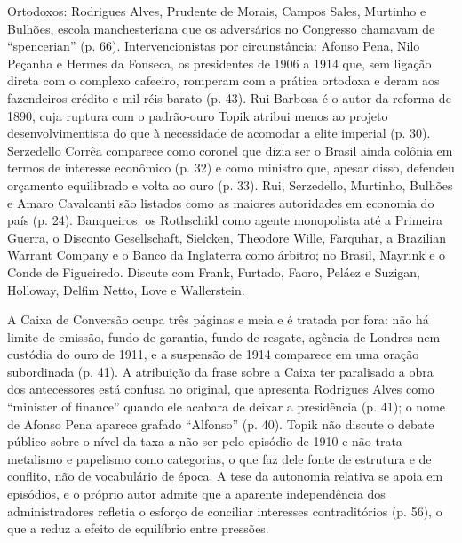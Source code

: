 Ortodoxos: Rodrigues Alves, Prudente de Morais, Campos Sales, Murtinho e Bulhões,
escola manchesteriana que os adversários no Congresso chamavam de ``spencerian''
(p. 66). Intervencionistas por circunstância: Afonso Pena, Nilo Peçanha e Hermes
da Fonseca, os presidentes de 1906 a 1914 que, sem ligação direta com o complexo
cafeeiro, romperam com a prática ortodoxa e deram aos fazendeiros crédito e
mil-réis barato (p. 43). Rui Barbosa é o autor da reforma de 1890, cuja ruptura
com o padrão-ouro Topik atribui menos ao projeto desenvolvimentista do que à
necessidade de acomodar a elite imperial (p. 30). Serzedello Corrêa comparece
como coronel que dizia ser o Brasil ainda colônia em termos de interesse
econômico (p. 32) e como ministro que, apesar disso, defendeu orçamento
equilibrado e volta ao ouro (p. 33). Rui, Serzedello, Murtinho, Bulhões e Amaro
Cavalcanti são listados como as maiores autoridades em economia do país (p. 24).
Banqueiros: os Rothschild como agente monopolista até a Primeira Guerra, o
Disconto Gesellschaft, Sielcken, Theodore Wille, Farquhar, a Brazilian Warrant
Company e o Banco da Inglaterra como árbitro; no Brasil, Mayrink e o Conde de
Figueiredo. Discute com Frank, Furtado, Faoro, Peláez e Suzigan, Holloway, Delfim
Netto, Love e Wallerstein.

A Caixa de Conversão ocupa três páginas e meia e é tratada por fora: não há
limite de emissão, fundo de garantia, fundo de resgate, agência de Londres nem
custódia do ouro de 1911, e a suspensão de 1914 comparece em uma oração
subordinada (p. 41). A atribuição da frase sobre a Caixa ter paralisado a obra
dos antecessores está confusa no original, que apresenta Rodrigues Alves como
``minister of finance'' quando ele acabara de deixar a presidência (p. 41); o
nome de Afonso Pena aparece grafado ``Alfonso'' (p. 40). Topik não discute o
debate público sobre o nível da taxa a não ser pelo episódio de 1910 e não trata
metalismo e papelismo como categorias, o que faz dele fonte de estrutura e de
conflito, não de vocabulário de época. A tese da autonomia relativa se apoia em
episódios, e o próprio autor admite que a aparente independência dos
administradores refletia o esforço de conciliar interesses contraditórios
(p. 56), o que a reduz a efeito de equilíbrio entre pressões.

